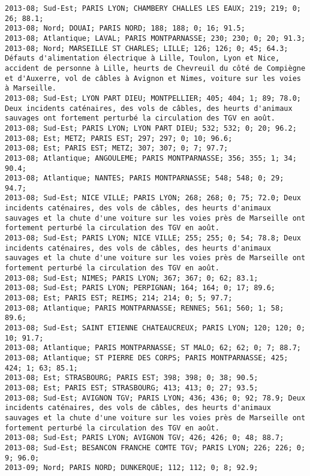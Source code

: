 \documentclass{article}
\begin{document}
\begin{Verbatim}[commandchars=\\\{\}]
2013-08; Sud-Est; PARIS LYON; CHAMBERY CHALLES LES EAUX; 219; 219; 0; 26; 88.1; 
2013-08; Nord; DOUAI; PARIS NORD; 188; 188; 0; 16; 91.5; 
2013-08; Atlantique; LAVAL; PARIS MONTPARNASSE; 230; 230; 0; 20; 91.3; 
2013-08; Nord; MARSEILLE ST CHARLES; LILLE; 126; 126; 0; 45; 64.3; Défauts d'alimentation électrique à Lille, Toulon, Lyon et Nice, accident de personne à Lille, heurts de Chevreuil du côté de Compiègne et d'Auxerre, vol de câbles à Avignon et Nimes, voiture sur les voies à Marseille.
2013-08; Sud-Est; LYON PART DIEU; MONTPELLIER; 405; 404; 1; 89; 78.0; Deux incidents caténaires, des vols de câbles, des heurts d'animaux sauvages ont fortement perturbé la circulation des TGV en août.
2013-08; Sud-Est; PARIS LYON; LYON PART DIEU; 532; 532; 0; 20; 96.2; 
2013-08; Est; METZ; PARIS EST; 297; 297; 0; 10; 96.6; 
2013-08; Est; PARIS EST; METZ; 307; 307; 0; 7; 97.7; 
2013-08; Atlantique; ANGOULEME; PARIS MONTPARNASSE; 356; 355; 1; 34; 90.4; 
2013-08; Atlantique; NANTES; PARIS MONTPARNASSE; 548; 548; 0; 29; 94.7; 
2013-08; Sud-Est; NICE VILLE; PARIS LYON; 268; 268; 0; 75; 72.0; Deux incidents caténaires, des vols de câbles, des heurts d'animaux sauvages et la chute d'une voiture sur les voies près de Marseille ont fortement perturbé la circulation des TGV en août.
2013-08; Sud-Est; PARIS LYON; NICE VILLE; 255; 255; 0; 54; 78.8; Deux incidents caténaires, des vols de câbles, des heurts d'animaux sauvages et la chute d'une voiture sur les voies près de Marseille ont fortement perturbé la circulation des TGV en août.
2013-08; Sud-Est; NIMES; PARIS LYON; 367; 367; 0; 62; 83.1; 
2013-08; Sud-Est; PARIS LYON; PERPIGNAN; 164; 164; 0; 17; 89.6; 
2013-08; Est; PARIS EST; REIMS; 214; 214; 0; 5; 97.7; 
2013-08; Atlantique; PARIS MONTPARNASSE; RENNES; 561; 560; 1; 58; 89.6; 
2013-08; Sud-Est; SAINT ETIENNE CHATEAUCREUX; PARIS LYON; 120; 120; 0; 10; 91.7; 
2013-08; Atlantique; PARIS MONTPARNASSE; ST MALO; 62; 62; 0; 7; 88.7; 
2013-08; Atlantique; ST PIERRE DES CORPS; PARIS MONTPARNASSE; 425; 424; 1; 63; 85.1; 
2013-08; Est; STRASBOURG; PARIS EST; 398; 398; 0; 38; 90.5; 
2013-08; Est; PARIS EST; STRASBOURG; 413; 413; 0; 27; 93.5; 
2013-08; Sud-Est; AVIGNON TGV; PARIS LYON; 436; 436; 0; 92; 78.9; Deux incidents caténaires, des vols de câbles, des heurts d'animaux sauvages et la chute d'une voiture sur les voies près de Marseille ont fortement perturbé la circulation des TGV en août.
2013-08; Sud-Est; PARIS LYON; AVIGNON TGV; 426; 426; 0; 48; 88.7; 
2013-08; Sud-Est; BESANCON FRANCHE COMTE TGV; PARIS LYON; 226; 226; 0; 9; 96.0; 
2013-09; Nord; PARIS NORD; DUNKERQUE; 112; 112; 0; 8; 92.9; 

\end{Verbatim}
\end{document}
